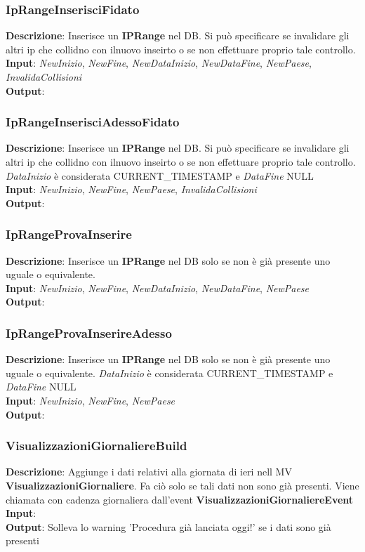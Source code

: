 \documentclass{article}
\begin{document}
\subsubsection{IpRangeInserisciFidato}
\textbf{Descrizione}: Inserisce un \textbf{IPRange} nel DB. Si può specificare se invalidare gli altri ip che collidno con ilnuovo inseirto o se non effettuare proprio tale controllo. \\
\textbf{Input}: \textit{NewInizio}, \textit{NewFine}, \textit{NewDataInizio}, \textit{NewDataFine}, \textit{NewPaese}, \textit{InvalidaCollisioni}  \\
\textbf{Output}: \\
\subsubsection{IpRangeInserisciAdessoFidato}
\textbf{Descrizione}: Inserisce un \textbf{IPRange} nel DB. Si può specificare se invalidare gli altri ip che collidno con ilnuovo inseirto o se non effettuare proprio tale controllo. \textit{DataInizio} è considerata CURRENT\_TIMESTAMP e \textit{DataFine} NULL\\
\textbf{Input}: \textit{NewInizio}, \textit{NewFine}, \textit{NewPaese}, \textit{InvalidaCollisioni}  \\
\textbf{Output}: \\
\subsubsection{IpRangeProvaInserire}
\textbf{Descrizione}: Inserisce un \textbf{IPRange} nel DB solo se non è già presente uno uguale o equivalente. \\
\textbf{Input}: \textit{NewInizio}, \textit{NewFine}, \textit{NewDataInizio}, \textit{NewDataFine}, \textit{NewPaese}  \\
\textbf{Output}: \\
\subsubsection{IpRangeProvaInserireAdesso}
\textbf{Descrizione}: Inserisce un \textbf{IPRange} nel DB solo se non è già presente uno uguale o equivalente. \textit{DataInizio} è considerata CURRENT\_TIMESTAMP e \textit{DataFine} NULL\\
\textbf{Input}: \textit{NewInizio}, \textit{NewFine}, \textit{NewPaese}  \\
\textbf{Output}: \\
\subsubsection{VisualizzazioniGiornaliereBuild}
\textbf{Descrizione}: Aggiunge i dati relativi alla giornata di ieri nell MV \textbf{VisualizzazioniGiornaliere}. Fa ciò solo se tali dati non sono già presenti. Viene chiamata con cadenza giornaliera dall'event \textbf{VisualizzazioniGiornaliereEvent} \\
\textbf{Input}: \\
\textbf{Output}: Solleva lo warning 'Procedura già lanciata oggi!' se i dati sono già presenti \\
\end{document}
